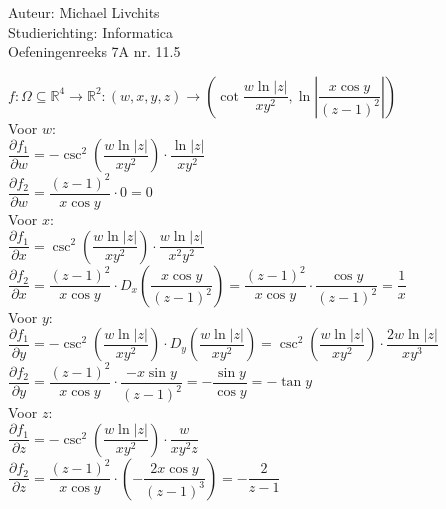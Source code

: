 \documentclass[a4paper]{article}
\begin{document}
  
\noindent \large Auteur: Michael Livchits \\
\noindent \large Studierichting: Informatica\\
\noindent \large Oefeningenreeks 7A nr. 11.5\\

\medskip

\normalsize

$f:\Omega \subseteq \mathbb{R}^4 \rightarrow \mathbb{R}^2:(w,x,y,z) \rightarrow \left(\cot\dfrac{w\ln|z|}{xy^2},\ln\left|\dfrac{x\cos y}{(z-1)^2}\right|\right)$\\

Voor $w$:\\

$\dfrac{\partial f_1}{\partial w} = -\csc^2\left(\dfrac{w\ln|z|}{xy^2}\right)\cdot\dfrac{\ln|z|}{xy^2}$\\

$\dfrac{\partial f_2}{\partial w} = \dfrac{(z-1)^2}{x\cos y}\cdot0 = 0$\\

Voor $x$:\\

$\dfrac{\partial f_1}{\partial x} = \csc^2\left(\dfrac{w\ln|z|}{xy^2}\right)\cdot\dfrac{w\ln|z|}{x^2y^2}$\\

$\dfrac{\partial f_2}{\partial x} = \dfrac{(z-1)^2}{x\cos y}\cdot D_x\left(\dfrac{x\cos y}{(z-1)^2}\right) = \dfrac{(z-1)^2}{x\cos y}\cdot\dfrac{\cos y}{(z-1)^2} = \dfrac{1}{x}$\\

Voor $y$:\\

$\dfrac{\partial f_1}{\partial y} = -\csc^2\left(\dfrac{w\ln|z|}{xy^2}\right)\cdot D_y\left(\dfrac{w\ln|z|}{xy^2}\right) = \csc^2\left(\dfrac{w\ln|z|}{xy^2}\right)\cdot\dfrac{2w\ln|z|}{xy^3}$\\

$\dfrac{\partial f_2}{\partial y} = \dfrac{(z-1)^2}{x\cos y}\cdot\dfrac{-x\sin y}{(z-1)^2} = -\dfrac{\sin y}{\cos y} = -\tan y$\\

Voor $z$:\\

$\dfrac{\partial f_1}{\partial z}=-\csc^2\left(\dfrac{w\ln|z|}{xy^2}\right)\cdot\dfrac{w}{xy^2z}$\\

$\dfrac{\partial f_2}{\partial z} = \dfrac{(z-1)^2}{x\cos y}\cdot\left(-\dfrac{2x\cos y}{(z-1)^3}\right) = -\dfrac{2}{z-1}$\\
\end{document}
